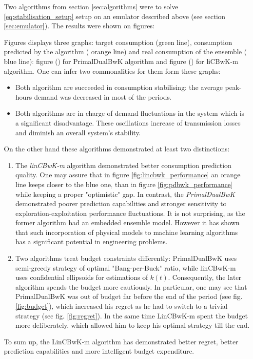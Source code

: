 Two algorithms from section \ref{sec:algorithms} were to solve \ref{eq:stabilisation_setup} setup on an emulator described above (see section \ref{sec:emulator}). The results were shown on figures: 

Figures displays three graphs: target consumption ({\color{green}green line}), consumption predicted by the algorithm ({\color{orange} orange line}) and real consumption of the ensemble ({\color{blue} blue line}): figure () for PrimalDualBwK algorithm and figure () for liCBwK-m algorithm. One can infer two commonalities for them form these graphs:
\begin{itemize}
    \item Both algorithm are succeeded in consumption stabilising: the average peak-hours demand was decreased in most of the periods. 
    \item Both algorithms are in charge of demand fluctuations in the system which is a significant disadvantage. These oscillations increase of transmission losses and diminish an overall system's stability.
\end{itemize}

On the other hand these algorithms demonstrated at least two distinctions: 
\begin{enumerate}
    \item The \textit{linCBwK-m} algorithm demonstrated better consumption prediction quality. One may assure that in figure \ref{fig:lincbwk_performance} an orange line keeps closer to the blue one, than in figure \ref{fig:pdbwk_performance} while keeping a proper "optimistic" gap. In contrast, the \textit{PrimalDualBwK} demonstrated poorer prediction capabilities and stronger sensitivity to exploration-exploitation performance fluctuations. It is not surprising, as the former algorithm had an embedded ensemble model. However it has shown that such incorporation of physical models to machine learning algorithms has a significant potential in engineering problems. 
    \item Two algorithms treat budget constraints differently: PrimalDualBwK uses semi-greedy strategy of optimal "Bang-per-Buck" ratio, while linCBwK-m uses confidential ellipsoids for estimations of $k(t)$. Consequently, the later algorithm spends the budget more cautiously. In particular, one may see that PrimalDualBwK was out of budget far before the end of the period (see fig. \ref{fig:budget}), which increased his regret as he had to switch to a trivial strategy (see fig. \ref{fig:regret}). In the same time LinCBwK-m spent the budget more deliberately, which allowed him to keep his optimal strategy till the end.
\end{enumerate}
To sum up, the LinCBwK-m algorithm has demonstrated better regret, better prediction capabilities and more intelligent budget expenditure.

